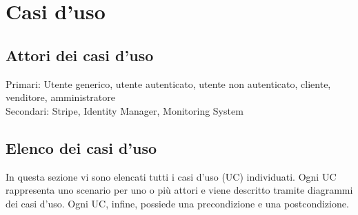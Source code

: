 \section{Casi d'uso}
\subsection{Attori dei casi d'uso}
Primari: Utente generico, utente autenticato, utente non autenticato, cliente, venditore, amministratore \\
Secondari: Stripe, Identity Manager, Monitoring System
\subsection{Elenco dei casi d'uso}
In questa sezione vi sono elencati tutti i casi d'uso (UC) individuati. Ogni UC rappresenta uno scenario per uno o più attori e viene descritto tramite diagrammi dei casi d'uso. Ogni UC, infine, possiede una precondizione e una postcondizione. \\










